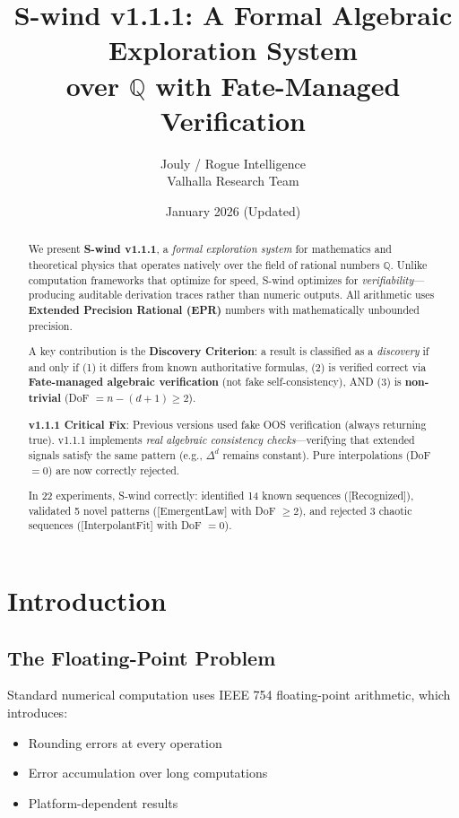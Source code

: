 \documentclass[11pt,a4paper]{article}
\title{\textbf{S-wind v1.1.1: A Formal Algebraic Exploration System\\over $\mathbb{Q}$ with Fate-Managed Verification}}
\author{Jouly / Rogue Intelligence\\
Valhalla Research Team}
\date{January 2026 (Updated)}
\begin{document}
\maketitle

\begin{abstract}
We present \textbf{S-wind v1.1.1}, a \emph{formal exploration system} for mathematics and theoretical physics that operates natively over the field of rational numbers $\mathbb{Q}$. Unlike computation frameworks that optimize for speed, S-wind optimizes for \emph{verifiability}---producing auditable derivation traces rather than numeric outputs. All arithmetic uses \textbf{Extended Precision Rational (EPR)} numbers with mathematically unbounded precision.

A key contribution is the \textbf{Discovery Criterion}: a result is classified as a \emph{discovery} if and only if (1) it differs from known authoritative formulas, (2) is verified correct via \textbf{Fate-managed algebraic verification} (not fake self-consistency), AND (3) is \textbf{non-trivial} (DoF $= n - (d+1) \geq 2$). 

\textbf{v1.1.1 Critical Fix}: Previous versions used fake OOS verification (always returning true). v1.1.1 implements \emph{real algebraic consistency checks}---verifying that extended signals satisfy the same pattern (e.g., $\Delta^d$ remains constant). Pure interpolations (DoF $= 0$) are now correctly rejected.

In 22 experiments, S-wind correctly: identified 14 known sequences ([Recognized]), validated 5 novel patterns ([EmergentLaw] with DoF $\geq 2$), and rejected 3 chaotic sequences ([InterpolantFit] with DoF $= 0$).
\end{abstract}

\section{Introduction}

\subsection{The Floating-Point Problem}

Standard numerical computation uses IEEE 754 floating-point arithmetic, which introduces:
\begin{itemize}
    \item Rounding errors at every operation
    \item Error accumulation over long computations
    \item Platform-dependent results
\end{itemize}
\end{document}
